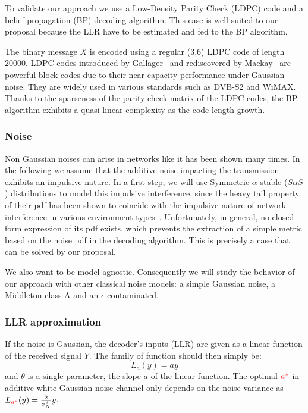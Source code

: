 \documentclass[a4paper]{IEEEtran}
\begin{document}
To validate our approach we use a Low-Density Parity Check
(LDPC) code and a belief propagation (BP) decoding
algorithm. This case is well-suited to our proposal because
the LLR have to be estimated and fed to the BP algorithm.

The binary message $X$ is encoded using a regular (3,6) LDPC
code of length 20000. LDPC codes introduced by
Gallager~\cite{G-1963} and rediscovered by
Mackay~\cite{MN-1996} are powerful block codes due to their
near capacity performance under Gaussian noise. They are
widely used in various standards such as DVB-S2 and WiMAX.\@
Thanks to the sparseness of the parity check matrix of the
LDPC codes, the BP algorithm exhibits a quasi-linear
complexity as the code length growth.


\subsubsection{Noise}

Non Gaussian noises can arise in networks like it has been
shown many times. In the following we assume that the
additive noise impacting the transmission exhibits an
impulsive nature. In a first step, we will use Symmetric
$\alpha$-stable ($S\alpha S$) distributions to model this
impulsive interference, since the heavy tail property of
their pdf has been shown to coincide with the impulsive
nature of network interference in various environment
types~\cite{NHJ-2008, MPL-2009, HLNFP-2010, E-1992}.
Unfortunately, in general, no closed-form expression of its
pdf exists, which prevents the extraction of a simple metric
based on the noise pdf in the decoding algorithm. This is
precisely a case that can be solved by our proposal.

We also want to be model agnostic. Consequently we will
study the behavior of our approach with other classical
noise models: a simple Gaussian noise, a Middleton class
A and an $\epsilon$-contaminated.


\subsubsection{LLR approximation}

If the noise is Gaussian, the decoder's inputs (LLR) are
given as a linear function of the received signal $Y$. The
family of function should then simply be:
\begin{equation}
  L_{a}(y)=ay
\end{equation}
and $\theta$ is a single parameter, the slope $a$ of the
linear function. The optimal $\color{red}a^*$ in additive
white Gaussian noise channel only depends on the noise
variance as $L_{\color{red}a^*}(y)=\frac{2}{\sigma_N^2}y$.
\end{document}
